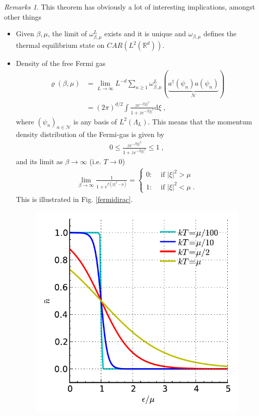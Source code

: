 \documentclass[
a4paper, %
11pt, %
onecolumn, %
openany, %
]{memoir}
\theoremstyle{definition}
\theoremstyle{remark}
\newtheorem{remarks}[definition]{Remarks}
\theoremstyle{plain}
\begin{document}
\begin{remarks} This theorem has obviously a lot of interesting implications, amongst other things
	\begin{itemize}
		 \item Given $\beta,\mu$, the limit of $\omega_{\beta,\mu}^L$ exists and it is unique and $\omega_{\beta,\mu}$ defines the thermal equilibrium state on $CAR(L^2(\mathbb{R}^d))$.
		 \item Density of the free Fermi gas \begin{align}
		 \varrho(\beta,\mu)&=\lim_{L\rightarrow\infty}L^{-d}\sum_{n\geq 1} \omega_{\beta,\mu}^L(\underbrace{a^{\dagger}(\psi_n)a(\psi_n)}_{\mathcal{N}})\\
		 &=(2\pi)^{d/2}\int \frac{ze^{-\beta|\xi|^2}}{1+ze^{-\beta|\xi|^2}}\mathrm{d}\xi\; ,
		 \end{align}
		 where $(\psi_n)_{n\in\mathcal{N}}$ is any basis of $L^2(\Lambda_L)$. This means that the momentum density distribution of the Fermi-gas is given by\begin{align}
		 0\leq \frac{ze^{-\beta|\xi|^2}}{1+ze^{-\beta|\xi|^2}}\leq 1\; ,
		 \end{align}
		 and its limit as $\beta\rightarrow\infty$ (i.e. $T\rightarrow 0$) \begin{align}
		 \lim_{\beta\rightarrow \infty}\frac{1}{1+e^{\beta(|\xi|^2-\mu)}}=\begin{cases}
		 0 :& \text{ if }|\xi|^2 > \mu\\
		 1 :& \text{ if }|\xi|^2< \mu \; .
		 \end{cases}\label{eqn::limit_of_fermi_density}
		 \end{align}
		 This is illustrated in Fig. \ref{fermidirac}. \begin{figure}\centering
		 	\includegraphics[scale=1]{fermidirac.pdf}

\end{figure}
\end{itemize}
\end{remarks}
\end{document}
